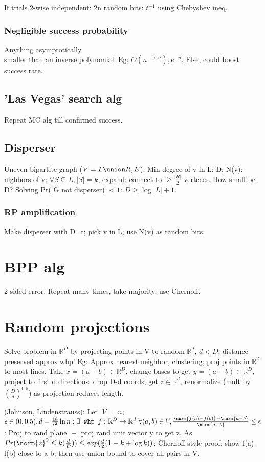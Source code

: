 \documentclass[oneside, article]{memoir}
\begin{document}
If trials 2-wise independent: 2n random bits: $t^{-1}$ using Chebyshev ineq. \chk

\subsubsection{Negligible success probability }
Anything asymptotically \\
smaller than an inverse polynomial. Eg: $O(n^{-\ln n}), e^{-n}$. Else, could boost success rate.

\subsection{'Las Vegas' search alg}
Repeat MC alg till confirmed success.

\subsection{Disperser}
Uneven bipartite graph ($V=L \union R, E$); Min degree of v in L: D; N(v): nighbors of v; $\forall S \subseteq L, |S|=k$, expand: connect to $\geq \frac{|R|}{2}$ verteces. How small be D? Solving Pr( G not disperser) $< 1$: $D \geq \log |L| + 1$.

\subsubsection{RP amplification} Make disperser with D=t; pick v in L; use N(v) as random bits. \tbc

\section{BPP alg}
2-sided error. Repeat many times, take majority, use Chernoff.

\section{Random projections}
Solve problem in $\mathbb{R}^{D}$ by projecting points in V to random $\mathbb{R}^{d}$, $d<D$; distance preserved approx whp! Eg: Approx nearest neighbor, clustering; proj points in $\mathbb{R}^{2}$ to most lines. Take $x = (a-b) \in \mathbb{R}^{D}$, change bases to get $y =(a-b) \in \mathbb{R}^{D}$, project to first d directions: drop D-d coords, get $z \in \mathbb{R}^{d}$, renormalize (mult by $(\frac{D}{d})^{0.5}$) as projection reduces length.

(Johnson, Lindenstrauss): Let $|V|=n$; $\epsilon \in (0,0.5), d = \frac{18}{\epsilon^{2}}\ln n: \exists \texttt{ whp } f:\mathbb{R}^{D} \to \mathbb{R}^{d}\ \forall (a,b) \in V, \frac{\norm{f(a)-f(b)}-\norm{a-b}}{\norm{a-b}} \leq \epsilon$ : Proj to rand plane $\equiv$ proj rand unit vector y to get z. As $Pr(\norm{z}^{2} \leq k(\frac{d}{D})) \leq exp(\frac{d}{2} (1-k+\log k))$: Chernoff style proof; show f(a)-f(b) close to a-b; then use union bound to cover all pairs in V.
\end{document}
